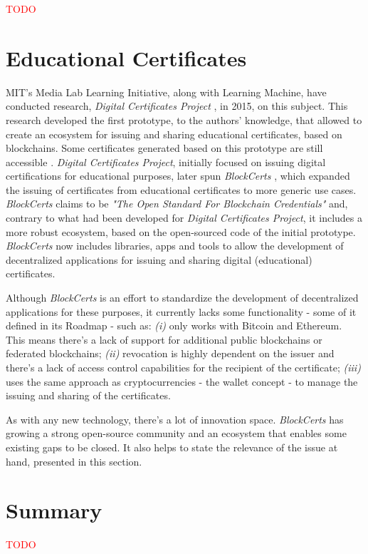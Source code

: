 \textcolor{red}{TODO}

\section{Educational Certificates}
\label{sec:related-ec}

MIT's Media Lab Learning Initiative, along with Learning Machine, have conducted research, \textit{Digital Certificates Project} \cite{MITCertificates}, in 2015, on this subject. This research developed the first prototype, to the authors' knowledge, that allowed to create an ecosystem for issuing and sharing educational certificates, based on blockchains. Some certificates generated based on this prototype are still accessible \cite{MITCertificatesBootcamp}. \textit{Digital Certificates Project}, initially focused on issuing digital certifications for educational purposes, later spun \textit{BlockCerts} \cite{Blockcerts}, which expanded the issuing of certificates from educational certificates to more generic use cases. \textit{BlockCerts} claims to be \textit{"The Open Standard For Blockchain Credentials"} and, contrary to what had been developed for \textit{Digital Certificates Project}, it includes a more robust ecosystem, based on the open-sourced code of the initial prototype. \textit{BlockCerts} now includes libraries, apps and tools to allow the development of decentralized  applications for issuing and sharing digital (educational) certificates.

Although \textit{BlockCerts} is an effort to standardize the development of decentralized applications for these purposes, it currently lacks some functionality - some of it defined in its Roadmap - such as: \emph{(i)} only works with Bitcoin and Ethereum. This means there's a lack of support for additional public blockchains or federated blockchains; \emph{(ii)} revocation is highly dependent on the issuer and there's a lack of access control capabilities for the recipient of the certificate; \emph{(iii)} uses the same approach as cryptocurrencies - the wallet concept - to manage the issuing and sharing of the certificates.

As with any new technology, there's a lot of innovation space. \textit{BlockCerts} has growing a strong open-source community and an ecosystem that enables some existing gaps to be closed. It also helps to state the relevance of the issue at hand, presented in this section.

\section{Summary}

\textcolor{red}{TODO}

